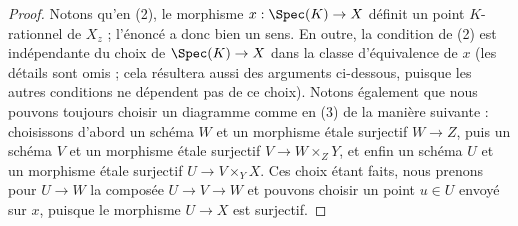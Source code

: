 \begin{proof}
Notons qu'en (2), le morphisme $x : \Spec(K) \to X$ définit un
point $K$-rationnel de $X_z$ ; l'énoncé a donc bien un sens. En outre,
la condition de (2) est indépendante du choix de $\Spec(K) \to X$
dans la classe d'équivalence de $x$ (les détails sont omis ; cela résultera aussi
des arguments ci-dessous, puisque les autres conditions ne dépendent pas
de ce choix). Notons également que nous pouvons toujours choisir un diagramme comme en
(3) de la manière suivante : choisissons d'abord
un schéma $W$ et un morphisme étale surjectif $W \to Z$, puis
un schéma $V$ et un morphisme étale surjectif $V \to W \times_Z Y$, et
enfin un schéma $U$ et un morphisme étale surjectif
$U \to V \times_Y X$. Ces choix étant faits, nous prenons pour $U \to W$
la composée $U \to V \to W$ et pouvons choisir un point $u \in U$ envoyé
sur $x$, puisque le morphisme $U \to X$ est surjectif.


\end{proof}

